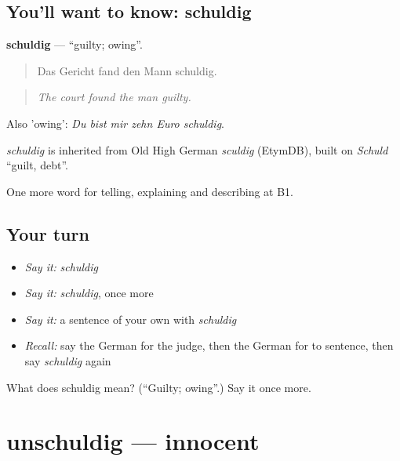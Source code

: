\subsection*{You'll want to know: schuldig}
\textbf{schuldig} — \textquotedblleft{}guilty; owing\textquotedblright{}.

\begin{quote}
Das Gericht fand den Mann schuldig.
\end{quote}

\begin{quote}
\emph{The court found the man guilty.}
\end{quote}

Also 'owing': \emph{Du bist mir zehn Euro schuldig}.

\begin{cousinweb}
\emph{schuldig} is inherited from Old High German \emph{sculdig} (EtymDB), built on \emph{Schuld} \textquotedblleft{}guilt, debt\textquotedblright{}.
\end{cousinweb}

\begin{grammarlens}[title={What you've built}]
One more word for telling, explaining and describing at B1.
\end{grammarlens}

\subsection*{Your turn}
\begin{itemize}
\raggedright
  \item \emph{Say it:} \emph{schuldig}
  \item \emph{Say it:} \emph{schuldig}, once more
  \item \emph{Say it:} a sentence of your own with \emph{schuldig}
  \item \emph{Recall:} say the German for the judge, then the German for to sentence, then say \emph{schuldig} again
\end{itemize}

\begin{tcolorbox}[breakable,colback=teal!4,colframe=teal!35!black,title={Before you move on}]
What does schuldig mean? (\textquotedblleft{}Guilty; owing\textquotedblright{}.) Say it once more.
\end{tcolorbox}
\section[unschuldig]{unschuldig — innocent}

